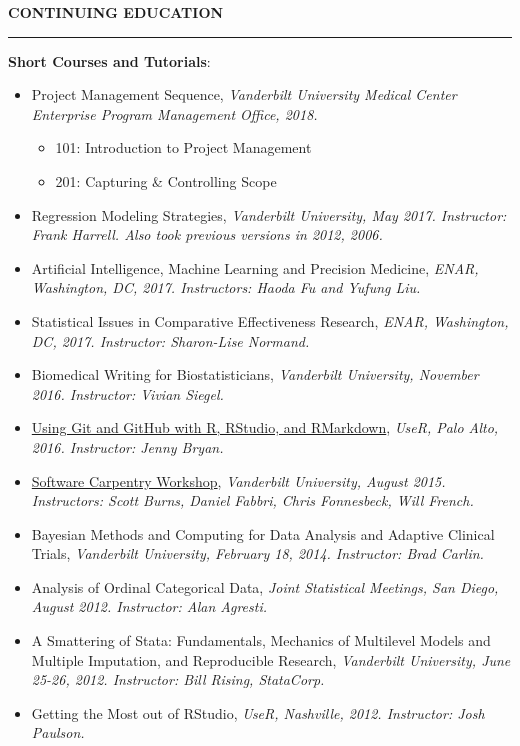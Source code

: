 \documentclass[5pt]{article}
\begin{document}
\noindent \linebreak \textbf{CONTINUING EDUCATION}\\
\rule[5pt]{\linewidth}{1.0pt}
\noindent \textbf{Short Courses and Tutorials}:
\begin{itemize}
\item Project Management Sequence, \emph{Vanderbilt University Medical Center Enterprise Program Management Office, 2018.}
  \begin{itemize}
  \item 101: Introduction to Project Management
  \item 201: Capturing \& Controlling Scope
  \end{itemize}
\item Regression Modeling Strategies, \emph{Vanderbilt University, May 2017. Instructor: Frank Harrell. Also took previous versions in 2012, 2006.}
\item Artificial Intelligence, Machine Learning and Precision Medicine, \emph{ENAR, Washington, DC, 2017. Instructors: Haoda Fu and Yufung Liu.}
\item Statistical Issues in Comparative Effectiveness Research, \emph{ENAR, Washington, DC, 2017. Instructor: Sharon-Lise Normand.}
\item Biomedical Writing for Biostatisticians, \emph{Vanderbilt University, November 2016. Instructor: Vivian Siegel.}
\item \href{http://user2016.org/tutorials/01.html}{Using Git and GitHub with R, RStudio, and RMarkdown}, \emph{UseR, Palo Alto, 2016. Instructor: Jenny Bryan.}
\item \href{https://software-carpentry.org/workshops/}{Software Carpentry Workshop}, \emph{Vanderbilt University, August 2015. Instructors: Scott Burns, Daniel Fabbri, Chris Fonnesbeck, Will French.}
\item Bayesian Methods and Computing for Data Analysis and Adaptive Clinical Trials, \emph{Vanderbilt University, February 18, 2014. Instructor: Brad Carlin.}
\item Analysis of Ordinal Categorical Data, \emph{Joint Statistical Meetings, San Diego, August 2012. Instructor: Alan Agresti.}
\item A Smattering of Stata: Fundamentals, Mechanics of Multilevel Models and Multiple Imputation, and Reproducible Research, \emph{Vanderbilt University, June 25-26, 2012. Instructor: Bill Rising, StataCorp.}
\item Getting the Most out of RStudio, \emph{UseR, Nashville, 2012. Instructor: Josh Paulson.}

\end{itemize}
\end{document}
